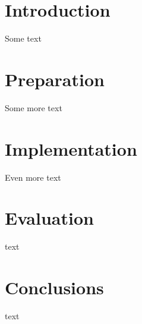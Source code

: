 \documentclass[a4paper,12pt,oneside,openright]{report}
\begin{document}
\pagestyle{empty}
\singlespacing

\onehalfspacing



\singlespacing
{}
\setcounter{page}{0}
\pagestyle{plain}
\tableofcontents
\listoffigures
\listoftables

\onehalfspacing


\chapter{Introduction}
\setcounter{page}{1}

Some text
\chapter{Preparation}

Some more text
\chapter{Implementation}
Even more text
\chapter{Evaluation}
text
\chapter{Conclusions}
text
\end{document}
